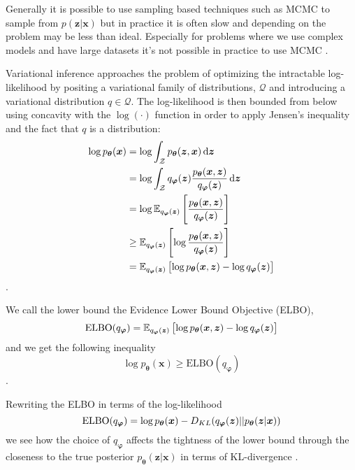 Generally it is possible to use sampling based techniques such as MCMC
\cite{brooks2011handbook} to sample from $p(\bm{z} | \bm{x})$ but in practice it is
often slow and depending on the problem may be less than ideal. Especially for
problems where we use complex models and have large datasets it's not possible
in practice to use MCMC \cite{blei_variational_2017}.

Variational inference approaches the problem of optimizing the intractable
log-likelihood by positing a variational family of distributions,
$\mathcal{Q}$ and introducing a variational distribution $q \in \mathcal{Q}$. The
log-likelihood is then bounded from below using concavity with the
$\log( \cdot )$ function in order to apply Jensen's inequality and the fact that
$q$ is a distribution:
\begin{align*}
  \log p_{\bm{\theta}}(\bm{x}) & = \log \int_{\mathcal{Z}} p_{\bm{\theta}}(\bm{z}, \bm{x}) \dif \bm{z}\\
                               & = \log \int_{\mathcal{Z}}q_{\bm{\varphi}}(\bm{z})  \frac{p_{\bm{\theta}}(\bm{x}, \bm{z})}{q_{\bm{\varphi}}(\bm{z})} \dif \bm{z} \\
                               & = \log \E_{q_{\bm{\varphi}}(\bm{z})}\left[\frac{p_{\bm{\theta}}(\bm{x}, \bm{z})}{q_{\bm{\varphi}}(\bm{z})}\right] \\
                               & \geq \E_{q_{\bm{\varphi}}(\bm{z})}\left[\log \frac{p_{\bm{\theta}}(\bm{x}, \bm{z})}{q_{\bm{\varphi}}(\bm{z})}\right] \\
                               & = \E_{q_{\bm{\varphi}}(\bm{z})}\left[\log p_{\bm{\theta}}(\bm{x}, \bm{z}) - \log q_{\bm{\varphi}}(\bm{z})\right] \\
\end{align*}.

We call the lower bound the Evidence Lower Bound Objective (ELBO),
\begin{equation}
  \label{eq:ELBO}
  \text{ELBO}(q_{\bm{\varphi}}) =
  \operatorname{\mathbb{E}}_{q_{\bm{\varphi}}(\bm{z})}\left[ \log p_{\bm{\theta}}(\bm{x}, \bm{z}) - \log
    q_{\bm{\varphi}}(\bm{z}) \right]
\end{equation}
and we get the following inequality
\begin{equation}
  \label{eq:ELBO_inequality}
  \log p_{\bm{\theta}}(\bm{x}) \geq \text{ELBO}(q_{\bm{\varphi}})
\end{equation}.

Rewriting the ELBO in terms of the log-likelihood
\begin{equation}
  \label{eq:ELBO_decomposed}
  \text{ELBO}(q_{\bm{\varphi}}) = \log p_{\bm{\theta}}(\bm{x}) - D_{KL}(q_{\bm{\varphi}}(\bm{z}) || p_{\bm{\theta}}(\bm{z} | \bm{x}))
\end{equation}
we see how the choice of $q_{\bm{\varphi}}$ affects the tightness of the
lower bound through the closeness to the true posterior $p_{\bm{\theta}}(\bm{z}
| \bm{x})$ in terms of KL-divergence \cite{blei_variational_2017}.

